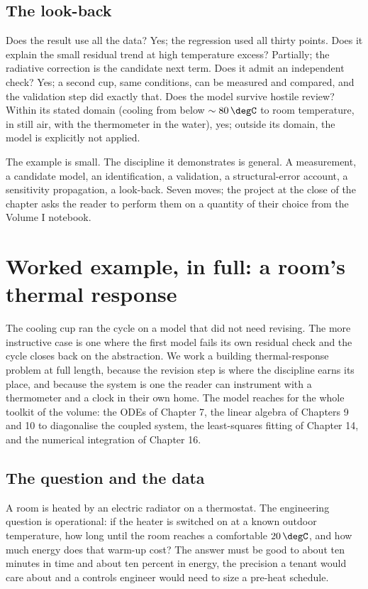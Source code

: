 \subsection{The look-back}

Does the result use all the data? Yes; the regression used all
thirty points. Does it explain the small residual trend at high
temperature excess? Partially; the radiative correction is the
candidate next term. Does it admit an independent check? Yes; a
second cup, same conditions, can be measured and compared, and
the validation step did exactly that. Does the model survive
hostile review? Within its stated domain (cooling from below
$\sim 80\,\degC$ to room temperature, in still air, with the
thermometer in the water), yes; outside its domain, the model is
explicitly not applied.

The example is small. The discipline it demonstrates is general.
A measurement, a candidate model, an identification, a validation,
a structural-error account, a sensitivity propagation, a look-back.
Seven moves; the project at the close of the chapter asks the
reader to perform them on a quantity of their choice from the
Volume I notebook.

\section{Worked example, in full: a room's thermal response}

The cooling cup ran the cycle on a model that did not need revising. The
more instructive case is one where the first model fails its own
residual check and the cycle closes back on the abstraction. We work a
building thermal-response problem at full length, because the revision
step is where the discipline earns its place, and because the system is
one the reader can instrument with a thermometer and a clock in their
own home. The model reaches for the whole toolkit of the volume: the
ODEs of Chapter 7, the linear algebra of Chapters 9 and 10 to diagonalise
the coupled system, the least-squares fitting of Chapter 14, and the
numerical integration of Chapter 16.

\subsection{The question and the data}

A room is heated by an electric radiator on a thermostat. The
engineering question is operational: if the heater is switched on at a
known outdoor temperature, how long until the room reaches a comfortable
$20\,\degC$, and how much energy does that warm-up cost? The answer must
be good to about ten minutes in time and about ten percent in energy,
the precision a tenant would care about and a controls engineer would
need to size a pre-heat schedule.

